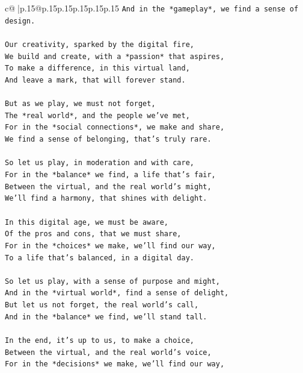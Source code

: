 \documentclass{article}
\begin{document}
{\begin{supertabular}{c@{$\;$}|p{.15\linewidth}@{}p{.15\linewidth}p{.15\linewidth}p{.15\linewidth}p{.15\linewidth}p{.15\linewidth}}
{{{\texttt{And in the *gameplay*, we find a sense of design.} \\
\\ 
\texttt{Our creativity, sparked by the digital fire,} \\
\texttt{We build and create, with a *passion* that aspires,} \\
\texttt{To make a difference, in this virtual land,} \\
\texttt{And leave a mark, that will forever stand.} \\
\\ 
\texttt{But as we play, we must not forget,} \\
\texttt{The *real world*, and the people we've met,} \\
\texttt{For in the *social connections*, we make and share,} \\
\texttt{We find a sense of belonging, that's truly rare.} \\
\\ 
\texttt{So let us play, in moderation and with care,} \\
\texttt{For in the *balance* we find, a life that's fair,} \\
\texttt{Between the virtual, and the real world's might,} \\
\texttt{We'll find a harmony, that shines with delight.} \\
\\ 
\texttt{In this digital age, we must be aware,} \\
\texttt{Of the pros and cons, that we must share,} \\
\texttt{For in the *choices* we make, we'll find our way,} \\
\texttt{To a life that's balanced, in a digital day.} \\
\\ 
\texttt{So let us play, with a sense of purpose and might,} \\
\texttt{And in the *virtual world*, find a sense of delight,} \\
\texttt{But let us not forget, the real world's call,} \\
\texttt{And in the *balance* we find, we'll stand tall.} \\
\\ 
\texttt{In the end, it's up to us, to make a choice,} \\
\texttt{Between the virtual, and the real world's voice,} \\
\texttt{For in the *decisions* we make, we'll find our way,} \\
}}}
\end{supertabular}}
\end{document}
